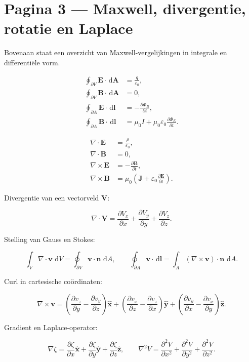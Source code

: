 \documentclass[11pt,a4paper]{article}
\newcommand{\vect}[1]{\mathbf{#1}}
\newcommand{\dd}{\,\mathrm{d}}
\begin{document}
\section*{Pagina 3 --- Maxwell, divergentie, rotatie en Laplace}
Bovenaan staat een overzicht van Maxwell-vergelijkingen in integrale en differentiële vorm.

$$
\begin{aligned}
\oint_{\partial V} \vect{E}\cdot \dd \vect{A}
    &= \frac{q}{\varepsilon_0},\\
\oint_{\partial V} \vect{B}\cdot \dd \vect{A}
    &= 0,\\
\oint_{\partial A} \vect{E}\cdot \dd \vect{l}
    &= -\frac{\partial \Phi_B}{\partial t},\\
\oint_{\partial A} \vect{B}\cdot \dd \vect{l}
    &= \mu_0 I+\mu_0\varepsilon_0\frac{\partial \Phi_E}{\partial t}.
\end{aligned}
$$

$$
\begin{aligned}
\nabla\cdot\vect{E} &= \frac{\rho}{\varepsilon_0},\\
\nabla\cdot\vect{B} &= 0,\\
\nabla\times\vect{E} &= -\frac{\partial \vect{B}}{\partial t},\\
\nabla\times\vect{B} &= \mu_0\left(\vect{J}+\varepsilon_0\frac{\partial \vect{E}}{\partial t}\right).
\end{aligned}
$$

Divergentie van een vectorveld $\vect{V}$:

$$
\nabla\cdot\vect{V}
=
\frac{\partial V_x}{\partial x}
+
\frac{\partial V_y}{\partial y}
+
\frac{\partial V_z}{\partial z}.
$$

Stelling van Gauss en Stokes:

$$
\int_V \nabla\cdot\vect{v}\,\dd V
=
\oint_{\partial V} \vect{v}\cdot\vect{n}\,\dd A,
\qquad
\oint_{\partial A}\vect{v}\cdot\dd\vect{l}
=
\int_A\left(\nabla\times\vect{v}\right)\cdot\vect{n}\,\dd A.
$$

Curl in cartesische coördinaten:

$$
\nabla\times\vect{v}
=
\left(\frac{\partial v_z}{\partial y}-\frac{\partial v_y}{\partial z}\right)\hat{\vect{x}}
+
\left(\frac{\partial v_x}{\partial z}-\frac{\partial v_z}{\partial x}\right)\hat{\vect{y}}
+
\left(\frac{\partial v_y}{\partial x}-\frac{\partial v_x}{\partial y}\right)\hat{\vect{z}}.
$$

Gradient en Laplace-operator:

$$
\nabla \zeta
=
\frac{\partial \zeta}{\partial x}\hat{\vect{x}}
+
\frac{\partial \zeta}{\partial y}\hat{\vect{y}}
+
\frac{\partial \zeta}{\partial z}\hat{\vect{z}},
\qquad
\nabla^2 V
=
\frac{\partial^2 V}{\partial x^2}
+
\frac{\partial^2 V}{\partial y^2}
+
\frac{\partial^2 V}{\partial z^2}.
$$
\end{document}
